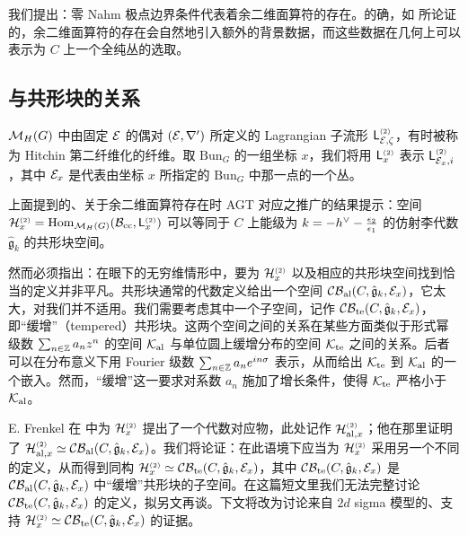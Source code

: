 我们提出：零 Nahm 极点边界条件代表着余二维面算符的存在。的确，如 \cite{FGT} 所论证的，余二维面算符的存在会自然地引入额外的背景数据，而这些数据在几何上可以表示为 $C$ 上一个全纯丛的选取。

\subsection{与共形块的关系}

$\mathcal{M}_H(G)$ 中由固定 $\mathcal{E}$ 的偶对 $(\mathcal{E},\nabla')$ 所定义的 Lagrangian 子流形 $\mathsf{L}_{\mathcal{E},\zeta}^{\scriptscriptstyle (2)}$，有时被称为 Hitchin 第二纤维化的纤维。取 $\mathrm{Bun}_G$ 的一组坐标 $x$，我们将用 $\mathsf{L}_{x}^{\scriptscriptstyle (2)}$ 表示 $\mathsf{L}_{\mathcal{E}_x,i}^{\scriptscriptstyle (2)}$，其中 $\mathcal{E}_x$ 是代表由坐标 $x$ 所指定的 $\mathrm{Bun}_G$ 中那一点的一个丛。

上面提到的、关于余二维面算符存在时 AGT 对应之推广的结果提示：空间 $\mathcal{H}^{\scriptscriptstyle (2)}_x={\rm Hom}_{\mathcal{M}_H(G)}(\mathcal{B}_{\rm cc},\mathsf{L}_{x}^{\scriptscriptstyle (2)})$ 可以等同于 $C$ 上能级为 $k=-h^{\vee}-\frac{\epsilon_2}{\epsilon_1}$ 的仿射李代数 $\hat{\mathfrak{g}}_k$ 的共形块空间。

然而必须指出：在眼下的无穷维情形中，要为 $\mathcal{H}^{\scriptscriptstyle (2)}_x$ 以及相应的共形块空间找到恰当的定义并非平凡。共形块通常的代数定义给出一个空间 $\mathcal{CB}_{\rm al}(C,\hat{\mathfrak{g}}_k,\mathcal{E}_x)$，它太大，对我们并不适用。我们需要考虑其中一个子空间，记作 $\mathcal{CB}_{\rm te}(C,\hat{\mathfrak{g}}_k,\mathcal{E}_x)$，即“缓增”（tempered）共形块。这两个空间之间的关系在某些方面类似于形式幂级数 $\sum_{n\in\mathbb{Z}}a_nz^n$ 的空间 $\mathcal{K}_{\rm al}$ 与单位圆上缓增分布的空间 $\mathcal{K}_{\rm te}$ 之间的关系。后者可以在分布意义下用 Fourier 级数 $\sum_{n\in\mathbb{Z}}a_ne^{in\sigma}$ 表示，从而给出 $\mathcal{K}_{\rm te}$ 到 $\mathcal{K}_{\rm al}$ 的一个嵌入。然而，“缓增”这一要求对系数 $a_n$ 施加了增长条件，使得 $\mathcal{K}_{\rm te}$ 严格小于 $\mathcal{K}_{\rm al}$。

E. Frenkel 在 \cite{Fr10} 中为 $\mathcal{H}^{\scriptscriptstyle (2)}_x$ 提出了一个代数对应物，此处记作 $\mathcal{H}^{\scriptscriptstyle (2)}_{{\rm al},x}$；他在那里证明了 $\mathcal{H}^{\scriptscriptstyle (2)}_{{\rm al},x}\simeq \mathcal{CB}_{\rm al}(C,\hat{\mathfrak{g}}_k,\mathcal{E}_x)$。我们将论证：在此语境下应当为 $\mathcal{H}^{\scriptscriptstyle (2)}_{x}$ 采用另一个不同的定义，从而得到同构 $\mathcal{H}^{\scriptscriptstyle (2)}_{x}\simeq \mathcal{CB}_{\rm te}(C,\hat{\mathfrak{g}}_k,\mathcal{E}_x)$，其中 $\mathcal{CB}_{\rm te}(C,\hat{\mathfrak{g}}_k,\mathcal{E}_x)$ 是 $\mathcal{CB}_{\rm al}(C,\hat{\mathfrak{g}}_k,\mathcal{E}_x)$ 中“缓增”共形块的子空间。在这篇短文里我们无法完整讨论 $\mathcal{CB}_{\rm te}(C,\hat{\mathfrak{g}}_k,\mathcal{E}_x)$ 的定义，拟另文再谈。下文将改为讨论来自 $2d$ sigma 模型的、支持 $\mathcal{H}^{\scriptscriptstyle (2)}_{x}\simeq \mathcal{CB}_{\rm te}(C,\hat{\mathfrak{g}}_k,\mathcal{E}_x)$ 的证据。

